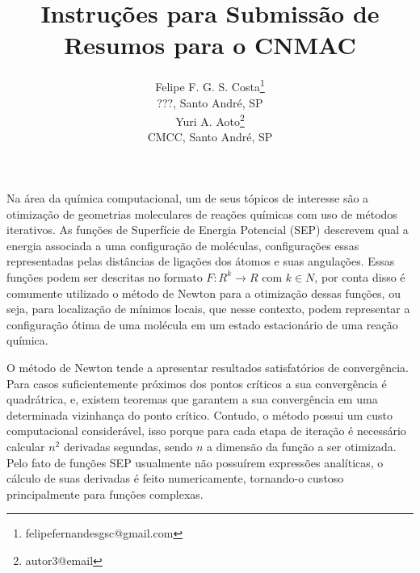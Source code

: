 \documentclass{pssbmac}
\begin{document}

\title{Instruções para Submissão de Resumos para o CNMAC}

\author{
    {\large Felipe F. G. S. Costa}\thanks{felipefernandesgsc@gmail.com} \\ %
    {\small ???, Santo André, SP} \\ %
    {\large Yuri A. Aoto}\thanks{autor3@email}  \\ %
    {\small CMCC, Santo André, SP} \\ %
}
\criartitulo



Na área da química computacional, um de seus tópicos de interesse são a otimização de geometrias moleculares de reações químicas com uso de métodos iterativos. As funções de Superfície de Energia Potencial (SEP) descrevem qual a energia associada a uma configuração de moléculas, configurações essas representadas pelas distâncias de ligações dos átomos e suas angulações. Essas funções podem ser descritas no formato $F: R^k\to R$ com $k \in N$, por conta disso é comumente utilizado o método de Newton para a otimização dessas funções, ou seja, para localização de mínimos locais, que nesse contexto, podem representar a configuração ótima de uma molécula em um estado estacionário de uma reação química.

O método de Newton tende a apresentar resultados satisfatórios de convergência. Para casos suficientemente próximos dos pontos críticos a sua convergência é quadrátrica, e, existem teoremas\cite{calculo_numerico_aplicado} que garantem a sua convergência em uma determinada vizinhança do ponto crítico. Contudo, o método possui um custo computacional considerável, isso porque para cada etapa de iteração é necessário calcular $n^2$ derivadas segundas, sendo $n$ a dimensão da função a ser otimizada. Pelo fato de funções SEP usualmente não possuírem expressões analíticas, o cálculo de suas derivadas é feito numericamente, tornando-o custoso principalmente para funções complexas.
\end{document}
